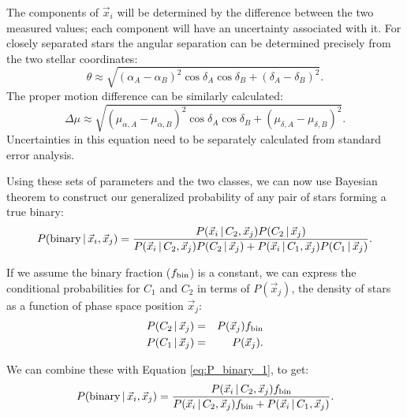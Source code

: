 \documentclass[usenatbib]{mnras}
\newcommand{\given}{\,|\,}
\begin{document}
The components of $\vec{x}_i$ will be determined by the difference between the two measured values; each component will have an uncertainty associated with it. For closely separated stars the angular separation can be determined precisely from the two stellar coordinates:
\begin{equation}
\theta \approx \sqrt{(\alpha_A - \alpha_B)^2 \cos \delta_A \cos \delta_B
			 + (\delta_A - \delta_B)^2}.
\end{equation}
The proper motion difference can be similarly calculated:
\begin{equation}
\Delta \mu \approx \sqrt{(\mu_{\alpha, A} - \mu_{\alpha, B})^2 
			\cos \delta_A \cos \delta_B 
			+ (\mu_{\delta, A} - \mu_{\delta, B})^2}.
\end{equation}
Uncertainties in this equation need to be separately calculated from standard error analysis.



Using these sets of parameters and the two classes, we can now use Bayesian theorem to construct our generalized probability of any pair of stars forming a true binary:
\begin{equation}
P({\rm binary} \given \vec{x}_i, \vec{x}_j) = \frac{P(\vec{x}_i \given C_2, \vec{x}_j) P(C_2 \given \vec{x}_j)}{P(\vec{x}_i \given C_2, \vec{x}_j) P(C_2 \given \vec{x}_j) + P(\vec{x}_i \given C_1, \vec{x}_j) P(C_1 \given \vec{x}_j)}. \label{eq:P_binary_1}
\end{equation}

If we assume the binary fraction ($f_{\rm bin}$) is a constant, we can express the conditional probabilities for $C_1$ and $C_2$ in terms of $P(\vec{x}_j)$, the density of stars as a function of phase space position $\vec{x}_j$:
\begin{eqnarray}
P(C_2 \given \vec{x}_j) &=& P(\vec{x}_j) f_{\rm bin} \\
P(C_1 \given \vec{x}_j) &=& P(\vec{x}_j).
\end{eqnarray}

We can combine these with Equation \ref{eq:P_binary_1}, to get:
\begin{equation}
P({\rm binary} \given \vec{x}_i, \vec{x}_j) = \frac{P(\vec{x}_i \given C_2, \vec{x}_j) f_{\rm bin} }{P(\vec{x}_i \given C_2, \vec{x}_j) f_{\rm bin}  + P(\vec{x}_i \given C_1, \vec{x}_j) }. \label{eq:P_binary_2}
\end{equation}


\end{document}
